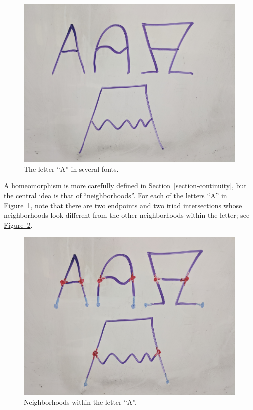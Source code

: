 \documentclass[10pt,]{article}
\begin{document}
\begin{figure}
\centering
\includegraphics[width=1\linewidth]{images/letter-a.jpg}
\caption{The letter ``A'' in several fonts.\label{figure-letter-a}}
\end{figure}
\hypertarget{p-14}{}%
A homeomorphism is more carefully defined in \hyperref[section-continuity]{Section~\ref{section-continuity}}, but the central idea is that of ``neighborhoods''. For each of the letters ``A'' in \hyperref[figure-letter-a]{Figure~\ref{figure-letter-a}}, note that there are two endpoints and two triad intersections whose neighborhoods look different from the other neighborhoods within the letter; see \hyperref[figure-letter-a-neighborhoods]{Figure~\ref{figure-letter-a-neighborhoods}}.%
\begin{figure}
\centering
\includegraphics[width=1\linewidth]{images/letter-a-neighborhoods.jpg}
\caption{Neighborhoods within the letter ``A''.\label{figure-letter-a-neighborhoods}}
\end{figure}
\end{document}
